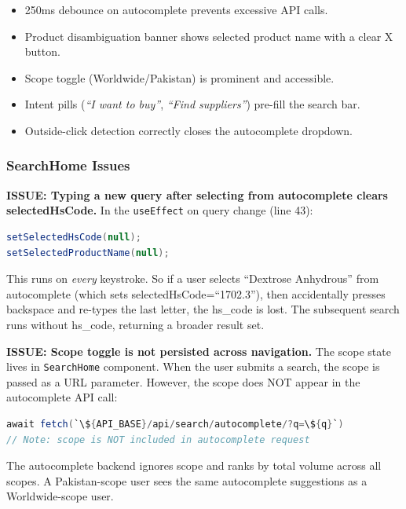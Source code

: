 \documentclass[12pt,a4paper]{article}
\begin{document}
\begin{okBox}
\begin{itemize}
  \item 250ms debounce on autocomplete prevents excessive API calls.
  \item Product disambiguation banner shows selected product name with a clear X button.
  \item Scope toggle (Worldwide/Pakistan) is prominent and accessible.
  \item Intent pills (\textit{``I want to buy''}, \textit{``Find suppliers''}) pre-fill the search bar.
  \item Outside-click detection correctly closes the autocomplete dropdown.
\end{itemize}
\end{okBox}

\subsubsection{SearchHome Issues}

\begin{issueBox}
\textbf{ISSUE: Typing a new query after selecting from autocomplete clears selectedHsCode.}
In the \texttt{useEffect} on query change (line 43):
\begin{lstlisting}[language=Java]
setSelectedHsCode(null);
setSelectedProductName(null);
\end{lstlisting}
This runs on \textit{every} keystroke. So if a user selects ``Dextrose Anhydrous'' from
autocomplete (which sets selectedHsCode=``1702.3''), then accidentally presses backspace
and re-types the last letter, the hs\_code is lost. The subsequent search runs without
hs\_code, returning a broader result set.
\end{issueBox}

\begin{issueBox}
\textbf{ISSUE: Scope toggle is not persisted across navigation.}
The scope state lives in \texttt{SearchHome} component. When the user submits a search,
the scope is passed as a URL parameter. However, the scope does NOT appear in the
autocomplete API call:
\begin{lstlisting}[language=Java]
await fetch(`\${API_BASE}/api/search/autocomplete/?q=\${q}`)
// Note: scope is NOT included in autocomplete request
\end{lstlisting}
The autocomplete backend ignores scope and ranks by total volume across all scopes.
A Pakistan-scope user sees the same autocomplete suggestions as a Worldwide-scope user.
\end{issueBox}
\end{document}
